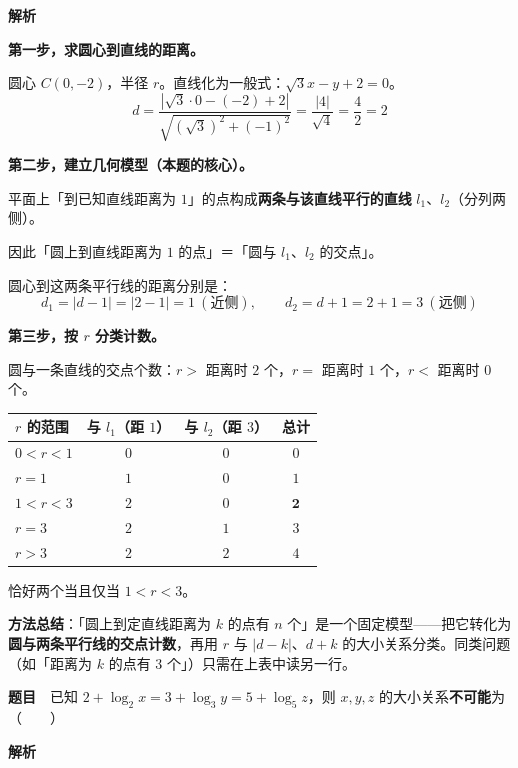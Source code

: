 \textbf{解析}

\textbf{第一步，求圆心到直线的距离。}

圆心 $C(0,-2)$，半径 $r$。直线化为一般式：$\sqrt3x-y+2=0$。
\[d=\frac{\left|\sqrt3\cdot0-(-2)+2\right|}{\sqrt{(\sqrt3)^2+(-1)^2}}=\frac{|4|}{\sqrt{4}}=\frac42=2\]

\textbf{第二步，建立几何模型（本题的核心）。}

平面上「到已知直线距离为 $1$」的点构成\textbf{两条与该直线平行的直线} $l_1$、$l_2$（分列两侧）。

因此「圆上到直线距离为 $1$ 的点」＝「圆与 $l_1$、$l_2$ 的交点」。

圆心到这两条平行线的距离分别是：
\[d_1=|d-1|=|2-1|=1\ (\text{近侧}),\qquad d_2=d+1=2+1=3\ (\text{远侧})\]

\textbf{第三步，按 $r$ 分类计数。}

圆与一条直线的交点个数：$r>$ 距离时 $2$ 个，$r=$ 距离时 $1$ 个，$r<$ 距离时 $0$ 个。

\begin{center}
\begin{tabular}{lccc}
\toprule
$r$ 的范围 & 与 $l_1$（距 $1$） & 与 $l_2$（距 $3$） & 总计 \\
\midrule
$0<r<1$ & $0$ & $0$ & $0$ \\
$r=1$ & $1$ & $0$ & $1$ \\
$1<r<3$ & $2$ & $0$ & $\mathbf 2$  \\
$r=3$ & $2$ & $1$ & $3$ \\
$r>3$ & $2$ & $2$ & $4$ \\
\bottomrule
\end{tabular}
\end{center}

恰好两个当且仅当 $1<r<3$。


\begin{gktip}
\textbf{方法总结}：「圆上到定直线距离为 $k$ 的点有 $n$ 个」是一个固定模型——把它转化为\textbf{圆与两条平行线的交点计数}，再用 $r$ 与 $|d-k|$、$d+k$ 的大小关系分类。同类问题（如「距离为 $k$ 的点有 $3$ 个」）只需在上表中读另一行。
\end{gktip}

\par\medskip


\textbf{题目}　已知 $2+\log_2x=3+\log_3y=5+\log_5z$，则 $x,y,z$ 的大小关系\textbf{不可能}为（　　）

\textbf{解析}

